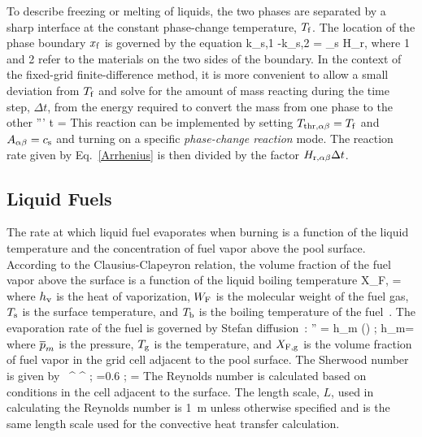 To describe freezing or melting of liquids, the two phases are separated by a sharp interface at the constant phase-change temperature, $T_{\rm f}$. The location of the phase boundary $x_{\rm f}$ is governed by the equation
\be
k_{\rm s,1} -k_{\rm s,2} = \rho_{\rm s} H_{\rm r,\alpha\beta} 
\ee
where 1 and 2 refer to the materials on the two sides of the boundary. In the context of the fixed-grid finite-difference method, it is more convenient
to allow a small deviation from $T_{\rm f}$ and solve for the amount of mass reacting during the time step, $\Delta t$,
from the energy required to convert the mass from one phase to the other
\be
{}''' \Delta t = 
\ee
This reaction can be implemented by setting $T_{\rm thr,\alpha\beta} = T_{\rm f}$ and $A_{\alpha\beta} = c_{\rm s}$ and turning on a specific
{\em phase-change reaction} mode. The reaction rate given by Eq.~\ref{Arrhenius} is then divided by the factor $H_{\rm r,\alpha\beta} \Delta t$.

\subsection{Liquid Fuels}

The rate at which liquid fuel evaporates when burning is a function of the liquid temperature and the concentration of fuel vapor above the pool surface. According to the Clausius-Clapeyron relation, the volume fraction of the fuel vapor above the surface is a function of the liquid boiling temperature
\be X_{\rm F,\ell} = \exp {}
\label{CC_liquid}
\ee
where $h_{\rm v}$ is the heat of vaporization, $W_{\rm F}$ is the molecular weight of the fuel gas, $T_{\rm s}$ is the surface temperature, and $T_{\rm b}$ is the boiling temperature of the fuel~\cite{Prasad:1}. The evaporation rate of the fuel is governed by Stefan diffusion~\cite{Taylor&Krishna}:
\be
{}'' = h_{\rm m} \;  \; \ln \left(\right) \quad ; \quad h_{\rm m}= 
\ee
where $\overline{p}_m$ is the pressure, $T_{\rm g}$ is the temperature, and $X_{\rm F,g}$ is the volume fraction of fuel vapor in the grid cell adjacent to the pool surface. The Sherwood number is given by
\be
{}~\SC^{} \RE^{} \quad ; =0.6 \quad ; \quad \RE= 
\ee
The Reynolds number is calculated based on conditions in the cell adjacent to the surface. The length scale, $L$, used in calculating the Reynolds number is \SI{1}{m} unless otherwise specified and is the same length scale used for the convective heat transfer calculation.

